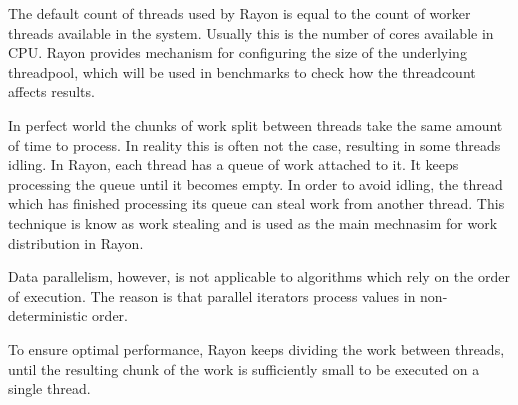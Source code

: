 
The default count of threads used by Rayon is equal to the count of worker threads available in the system. Usually this is the number of cores available in CPU. Rayon provides mechanism for configuring the size of the underlying threadpool, which will be used in benchmarks to check how the threadcount affects results. 


In perfect world the chunks of work split between threads take the same amount of time to process. In reality this is often not the case, resulting in some threads idling. In Rayon, each thread has a queue of work attached to it. It keeps processing the queue until it becomes empty. In order to avoid idling, the thread which has finished processing its queue can steal work from another thread. This technique is know as work stealing and is used as the main mechnasim for work distribution in Rayon. 





Data parallelism, however, is not applicable to algorithms which rely on the order of execution. The reason is that parallel iterators process values in non-deterministic order. 

To ensure optimal performance, Rayon keeps dividing the work between threads, until the resulting chunk of the work is sufficiently small to be executed on a single thread. 

